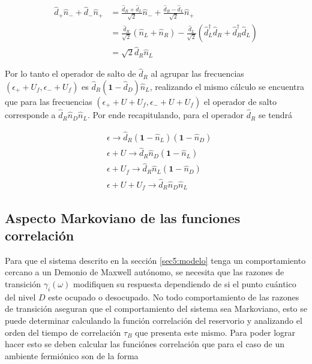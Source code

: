 \begin{appendixs}
\begin{align*}
    \hat{d}_{+}\hat{n}_{-} + \hat{d}_{-}\hat{n}_{+} & = \frac{\hat{d}_{R}+\hat{d}_{L}}{\sqrt{2}}\hat{n}_{-} + \frac{\hat{d}_{R}-\hat{d}_{L}}{\sqrt{2}}\hat{n}_{+}  \\
    & = \frac{\hat{d}_{R}}{\sqrt{2}}(\hat{n}_{L}+\hat{n}_{R}) - \frac{\hat{d}_{L}}{\sqrt{2}}(\hat{d}^{\dagger}_{L}\hat{d}_{R}+\hat{d}^{\dagger}_{R}\hat{d}_{L}) \\
    & = \sqrt{2}\hat{d}_{R}\hat{n}_{L}
\end{align*}

Por lo tanto el operador de salto de $\hat{d}_{R}$ al agrupar las frecuencias $(\epsilon_{+}+U_{f},\epsilon_{-}+U_{f})$ es $\hat{d}_{R}(\textbf{1}-\hat{d}_{D})\hat{n}_{L}$, realizando el mismo cálculo se encuentra que para las frecuencias $(\epsilon_{+}+U+U_{f},\epsilon_{-}+U+U_{f})$ el operador de salto corresponde a $\hat{d}_{R}\hat{n}_{D}\hat{n}_{L}$. Por ende recapitulando, para el operador $\hat{d}_{R}$ se tendrá

\begin{align*}
    &\epsilon \to \hat{d}_{R}(\textbf{1}-\hat{n}_{L})(\textbf{1}-\hat{n}_{D})\\
   &\epsilon + U \to \hat{d}_{R}\hat{n}_{D}(\textbf{1}-\hat{n}_{L})\\
    &\epsilon +U_{f}\to \hat{d}_{R}\hat{n}_{L}(\textbf{1}-\hat{n}_{D})\\
    &\epsilon +U+U_{f}\to \hat{d}_{R}\hat{n}_{D}\hat{n}_{L}
\end{align*}

\label{apendix5frecuencygroup}

\subsection{Aspecto Markoviano de las funciones correlación }
Para que el sistema descrito en la sección \ref{sec5:modelo} tenga un comportamiento cercano a un Demonio de Maxwell autónomo, se necesita que las razones de transición $\gamma_{i}(\omega)$ modifiquen su respuesta dependiendo de si el punto cuántico del nivel $D$ este ocupado o desocupado. No todo comportamiento de las razones de transición aseguran que el comportamiento del sistema sea Markoviano, esto se puede determinar calculando la función correlación del reservorio y analizando el orden del tiempo de correlación $\tau_{B}$ que presenta este mismo. Para poder lograr hacer esto se deben calcular las funciónes correlación que para el caso de un ambiente fermiónico son de la forma


\end{appendixs}
